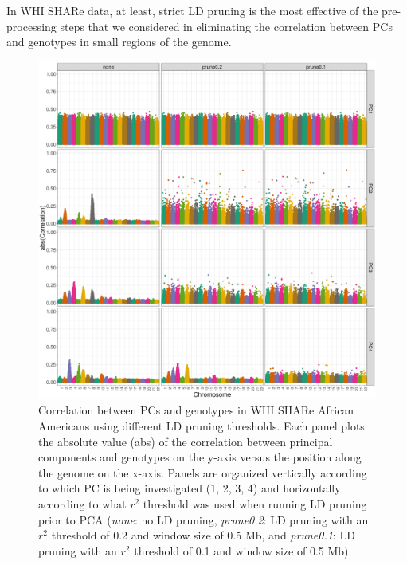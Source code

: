 \documentclass[12pt]{article}
\begin{document}
In WHI SHARe data, at least, strict LD pruning is the most effective of the pre-processing steps that we considered in eliminating the correlation between PCs and genotypes in small regions of the genome.

\begin{figure}
\center
\includegraphics[width=\textwidth]{figs/finalfigs/figS3_pc_geno_corr_compare_prune}
\caption[Correlation between PCs and genotypes using different LD pruning thresholds.]{Correlation between PCs and genotypes in WHI SHARe African Americans using different LD pruning thresholds. Each panel plots the absolute value (abs) of the correlation between principal components and genotypes on the y-axis versus the position along the genome on the x-axis.  Panels are organized vertically according to which PC is being investigated (1, 2, 3, 4) and horizontally according to what $r^2$ threshold was used when running LD pruning prior to PCA (\textit{none}: no LD pruning, \textit{prune0.2}: LD pruning with an $r^2$ threshold of 0.2 and window size of 0.5 Mb, and \textit{prune0.1}: LD pruning with an $r^2$ threshold of 0.1 and window size of 0.5 Mb).}
\label{fig:corr-compare-prune}
\end{figure}
\end{document}
